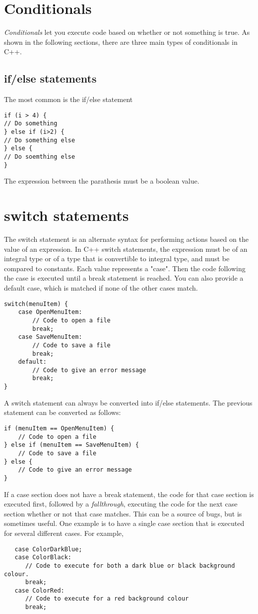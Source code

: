 \documentclass{article}
\begin{document}
\section{Conditionals}
\textit{Conditionals} let you execute code based on whether or not something is true.
As shown in the following sections, there are three main types of conditionals
in C++.
\subsection{if/else statements}
The most common is the if/else statement
\begin{verbatim}
if (i > 4) {
// Do something
} else if (i>2) {
// Do something else
} else {
// Do soemthing else
}
\end{verbatim}
The expression between the parathesis must be a boolean value.
\section{switch statements}
The switch statement is an alternate syntax for performing actions based on the value of an expression.
In C++ switch statements, the expression must be of an integral type or of a type that is convertible
to integral type, and must be compared to constants. Each value represents a "case". Then the code
following the case is executed until a break statement is reached. You can also provide a default case,
which is matched if none of the other cases match.
\begin{verbatim}
switch(menuItem) {
    case OpenMenuItem:
        // Code to open a file
        break;
    case SaveMenuItem:
        // Code to save a file
        break;
    default:
        // Code to give an error message
        break;
}
\end{verbatim}
A switch statement can always be converted into if/else statements. The previous statement can be
converted as follows:
\begin{verbatim}
if (menuItem == OpenMenuItem) {
    // Code to open a file
} else if (menuItem == SaveMenuItem) {
    // Code to save a file
} else {
    // Code to give an error message
}
\end{verbatim}
If a case section does not have a break statement, the code for that case section is executed first,
followed by a \textit{fallthrough}, executing the code for the next case section whether or not
that case matches. This can be a source of bugs, but is sometimes useful. One example is to have
a single case section that is executed for several different cases. For example,
\begin{verbatim}
   case ColorDarkBlue;
   case ColorBlack:
      // Code to execute for both a dark blue or black background colour.
      break;
   case ColorRed:
      // Code to execute for a red background colour
      break;
\end{verbatim}
\end{document}
